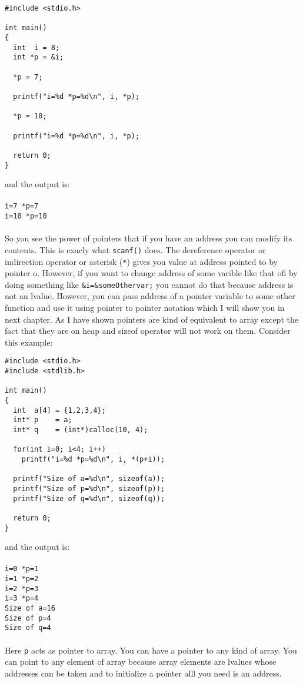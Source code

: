 \begin{verbatim}
#include <stdio.h>

int main()
{
  int  i = 8;
  int *p = &i;

  *p = 7;

  printf("i=%d *p=%d\n", i, *p);

  *p = 10;

  printf("i=%d *p=%d\n", i, *p);

  return 0;
}
\end{verbatim}
and the output is:
\\\\\texttt{i=7 *p=7\\
i=10 *p=10\\\\}
So you see the power of pointers that if you have an address you can modify its
contents. This is exacly what \texttt{scanf()} does. The dereference operator
or indirection operator or asterisk (\texttt{*}) gives you value at address
pointed to by pointer o. However, if you want to change address of some varible
like that ofi by doing something like \texttt{\&i=\&someOthervar;} you cannot do that
because address is not an lvalue. However, you can pass address of a pointer
variable to some other function and use it using pointer to pointer notation
which I will show you in next chapter. As I have shown pointers are kind of
equivalent to array except the fact that they are on heap and sizeof operator
will not work on them. Consider this example:

\begin{verbatim}
#include <stdio.h>
#include <stdlib.h>

int main()
{
  int  a[4] = {1,2,3,4};
  int* p    = a;
  int* q    = (int*)calloc(10, 4);

  for(int i=0; i<4; i++)
    printf("i=%d *p=%d\n", i, *(p+i));

  printf("Size of a=%d\n", sizeof(a));
  printf("Size of p=%d\n", sizeof(p));
  printf("Size of q=%d\n", sizeof(q));

  return 0;
}
\end{verbatim}
and the output is:
\\\\\texttt{i=0 *p=1\\
i=1 *p=2\\
i=2 *p=3\\
i=3 *p=4\\
Size of a=16\\
Size of p=4\\
Size of q=4\\\\}
Here \texttt{p} acts as pointer to array. You can have a pointer to any kind of
array. You can point to any element of array because array elements are lvalues
whose addresses can be taken and to initialize a pointer alll you need is an
address.


